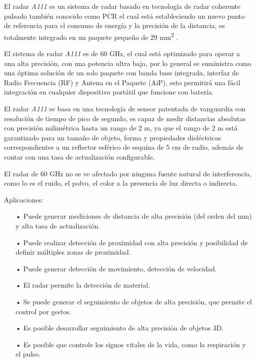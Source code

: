 El radar \textit{A111} es un sistema de radar basado en tecnología de radar coherente pulsado también conocido como PCR el cual está estableciendo un nuevo punto de referencia para el consumo de energía y la precisión de la distancia, es totalmente integrado en un paquete pequeño de 29 mm\textsuperscript{2} \cite{Acconeer2021}.

El sistema de radar \textit{A111} es de 60 GHz, el cual está optimizado para operar a una alta precisión, con una potencia ultra baja, por lo general se suministra como una óptima solución de un solo paquete con banda base integrada, interfaz de Radio Frecuencia (RF) y Antena en el Paquete (AiP), esto permitirá una fácil integración en cualquier dispositivo portátil que funcione con batería.

El radar \textit{A111} se basa en una tecnología de sensor patentada de vanguardia con resolución de tiempo de pico de segundo, es capaz de medir distancias absolutas con precisión milimétrica hasta un rango de 2 m, ya que el rango de 2 m está garantizado para un tamaño de objeto, forma y propiedades dieléctricas correspondientes a un reflector esférico de esquina de 5 cm de radio, además de contar con una tasa de actualización configurable.

El radar de 60 GHz no se ve afectado por ninguna fuente natural de interferencia, como lo es el ruido, el polvo, el color o la presencia de luz directa o indirecta.


Aplicaciones:
\begin{itemize}
	\item[•] Puede generar mediciones de distancia de alta precisión (del orden del mm) y alta tasa de actualización.
	\item[•] Puede realizar detección de proximidad con alta precisión y posibilidad de definir múltiples zonas de proximidad.
	\item[•] Puede generar detección de movimiento, detección de velocidad.
	\item[•] El radar permite la detección de material.
	\item[•] Se puede generar el seguimiento de objetos de alta precisión, que permite el control por gestos.
	\item[•] Es posible desarrollar seguimiento de alta precisión de objetos 3D.
	\item[•] Es posible que controle los signos vitales de la vida, como la respiración y el pulso.
\end{itemize}


